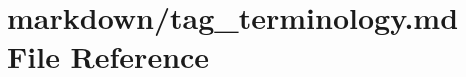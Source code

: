 \hypertarget{tag__terminology_8md}{}\section{markdown/tag\+\_\+terminology.md File Reference}
\label{tag__terminology_8md}
